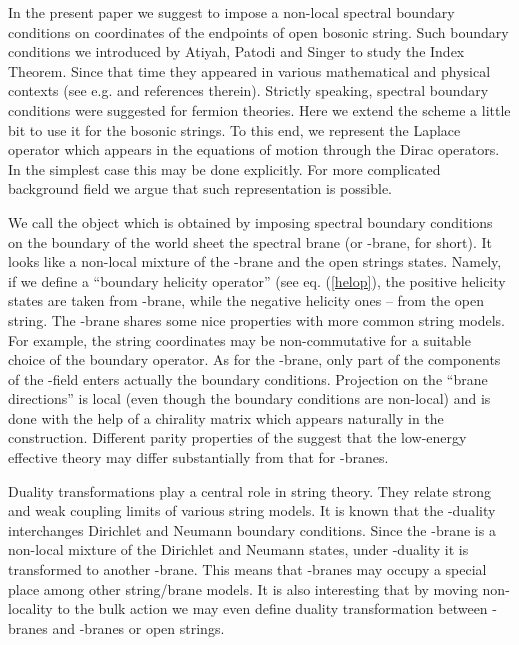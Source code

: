 \documentclass[a4paper,12pt,twoside]{article}
\begin{document}
In the present paper we suggest to impose a non-local
 spectral boundary conditions on coordinates of the endpoints
of open bosonic string. Such boundary conditions we introduced
by Atiyah, Patodi and Singer \cite{Atiyah:1980jh} to study
the Index Theorem. Since that time they appeared in
various mathematical and physical contexts (see e.g.
\cite{Grubb95,Dowker:2000sy,Mishchenko:1992vm,Falomir:1998as,Esposito:1997mw}
and references therein). Strictly speaking, spectral boundary
conditions were suggested for fermion theories. Here
we extend the scheme a little bit to use it for the bosonic
strings. To this end, we represent the Laplace operator
which appears in the equations of motion through the Dirac
operators. In the simplest case this may be done explicitly.
For more complicated background field we argue that such
representation is possible.

We call the object which is obtained by imposing spectral
boundary conditions on the boundary of the world sheet 
the spectral brane (or \coordHE{}-brane, for short). It
looks like a non-local mixture of the \coordHE{}-brane and the
open strings states. Namely, if we define a ``boundary helicity
operator'' (see eq. (\ref{helop}), the positive helicity
states are taken from \coordHE{}-brane, while the negative helicity
ones -- from the open string. The \coordHE{}-brane
shares some nice properties with more common string
models. For example, the string coordinates may be non-commutative
for a suitable choice of the boundary operator. As for the
\coordHE{}-brane, only part of the components of the \coordHE{}-field
enters actually the boundary conditions. Projection on
the ``brane directions'' is local (even though the boundary
conditions are non-local) and is done with the help
of a chirality matrix \coordHE{} which appears naturally
in the construction. Different parity properties of the \coordHE{}
suggest that the low-energy effective theory may differ 
substantially from that for \coordHE{}-branes.

Duality transformations play a central role in string
theory. They relate strong and weak coupling limits of
various string models.
It is known that the \coordHE{}-duality interchanges
Dirichlet and Neumann boundary conditions. Since the \coordHE{}-brane is
a non-local mixture of the Dirichlet and Neumann states,
under \coordHE{}-duality it is transformed to another \coordHE{}-brane.
This means that \coordHE{}-branes may occupy a special place among
other string/brane models. It is also interesting that
by moving non-locality to the bulk action we may even
define duality transformation between \coordHE{}-branes and
\coordHE{}-branes or open strings.
\end{document}
